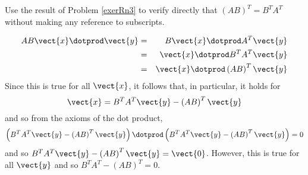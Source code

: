 \begin{enumialphparenastyle}
\begin{ex} Use the result of Problem \ref{exerRn3} to verify directly
that $\left( AB\right) ^{T}=B^{T}A^{T}$ without making any reference to
subscripts.
\begin{sol}
\begin{eqnarray*}
 AB\vect{x} \dotprod \vect{y} &=& B\vect{x} \dotprod A^{T}\vect{y} \\ 
&=& \vect{x}\dotprod B^{T}A^{T}\vect{y} \\
&=& \vect{x}\dotprod \left( AB\right) ^{T} \vect{y}
\end{eqnarray*}
Since this is true for all $\vect{x}$, it follows that, in particular, it
holds for
\[
\vect{x}=B^{T}A^{T}\vect{y}-\left( AB\right) ^{T}\vect{y}
\]
and so from the axioms of the dot product,
\[
\left( B^{T}A^{T}\vect{y}-\left( AB\right) ^{T}\vect{y}\right) \dotprod \left(B^{T}A^{T}
\vect{y}-\left( AB\right) ^{T}\vect{y}\right) =0
\]
and so $B^{T}A^{T}\vect{y}-\left( AB\right) ^{T}\vect{y}=\vect{0}$. However,
this is true for all $\vect{y}$ and so $B^{T}A^{T}-\left(
AB\right) ^{T}=0.$
\end{sol}
\end{ex}

\end{enumialphparenastyle}